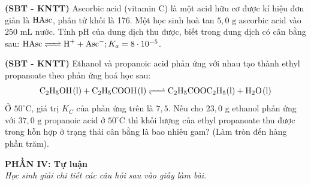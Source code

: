 \documentclass[12pt,a4paper]{article}
\begin{document}
\begin{ex}
\textbf{(SBT - KNTT)} Ascorbic acid (vitamin C) là một acid hữu cơ được kí hiệu đơn giản là $\ce{HAsc}$, phân tử khối là 176. Một học sinh hoà tan $5{,}0\text{ g}$ ascorbic acid vào $250\text{ mL}$ nước. Tính pH của dung dịch thu được, biết trong dung dịch có cân bằng sau: $\ce{HAsc <=> H+ + Asc-}; K_a = 8 \cdot 10^{-5}$.

\end{ex}

\begin{ex}
\textbf{(SBT - KNTT)} Ethanol và propanoic acid phản ứng với nhau tạo thành ethyl propanoate theo phản ứng hoá học sau:
\[\ce{C2H5OH(l) + C2H5COOH(l) <=> C2H5COOC2H5(l) + H2O(l)}\]
Ở $50^\circ\text{C}$, giá trị $K_C$ của phản ứng trên là $7{,}5$. Nếu cho $23{,}0\text{ g}$ ethanol phản ứng với $37{,}0\text{ g}$ propanoic acid ở $50^\circ\text{C}$ thì khối lượng của ethyl propanoate thu được trong hỗn hợp ở trạng thái cân bằng là bao nhiêu gam? (Làm tròn đến hàng phần trăm).

\end{ex}

\bigskip
\noindent
\textbf{PHẦN IV: Tự luận}\\
\textit{Học sinh giải chi tiết các câu hỏi sau vào giấy làm bài.}
\end{document}
